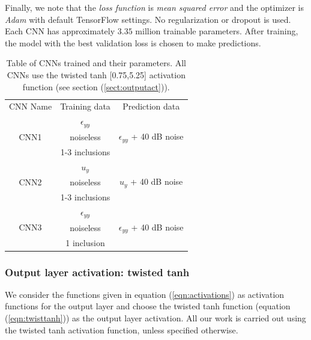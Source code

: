 \documentclass[12pt]{article}
\begin{document}
Finally, we note that the \textit{loss function} is \textit{mean squared error} and the optimizer is \textit{Adam} \cite{misc:kingma2017adam} with default TensorFlow settings. No regularization or dropout is used.  Each CNN has approximately $3.35$ million trainable parameters. After training, the model with the best validation loss is chosen to make predictions.
%
\begin{center}
\begin{table}
  \centering
  \begin{tabular}{|c|c|c|}
    \hline
    \multirow{2}{*}{CNN Name} &  \multirow{2}{*}{Training data}           & \multirow{2}{*}{Prediction data}\\
                              &                                           &  \\
     \hline
     \multirow{3}{*}{CNN1}    &  $\epsilon_{yy}$                           &  \multirow{3}{*}{$\epsilon_{yy}$ + 40 dB noise}\\
                              &  noiseless                                & \\
                              &  1-3 inclusions                           &\\
     \hline
     \multirow{3}{*}{CNN2}    &  $u_{y}$                                   & \multirow{3}{*}{$u_{y}$ + 40 dB noise}\\
                              &  noiseless                                & \\
                              &  1-3 inclusions                           &\\  
     \hline
     \multirow{3}{*}{CNN3}    &  $\epsilon_{yy}$                           & \multirow{3}{*}{$\epsilon_{yy}$ + 40 dB noise}\\
                              &  noiseless                                & \\
                              &  1 inclusion                              & \\

    \hline
  \end{tabular}
  \caption{\label{table:cnnparams} Table of CNNs trained and their parameters. All CNNs use the twisted tanh [0.75,5.25] activation function (see section (\ref{sect:outputact})).}
\end{table}
\end{center}
%
\subsubsection{\label{sect:outputact} Output layer activation: twisted tanh}
We consider the functions given in equation (\ref{eqn:activations}) as activation functions for the output layer and choose the twisted tanh function (equation (\ref{eqn:twisttanh})) as the output layer activation. All our work is carried out using the twisted tanh activation function, unless specified otherwise.
\end{document}
